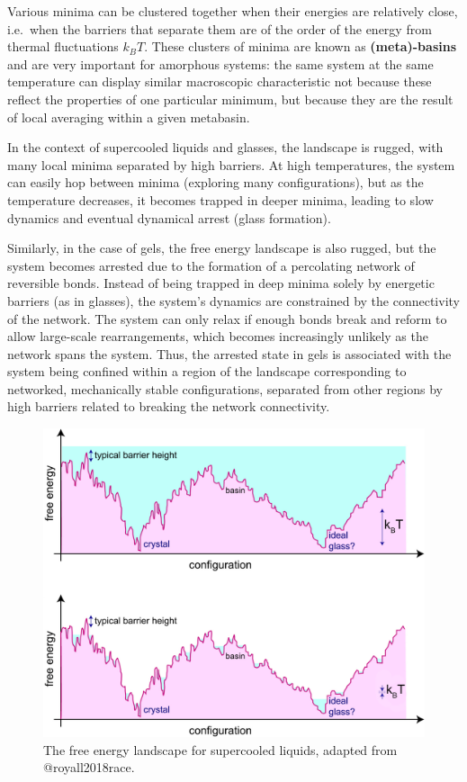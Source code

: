 \documentclass[
  letterpaper,
  enabledeprecatedfontcommands]{report}
\begin{document}
Various minima can be clustered together when their energies are
relatively close, i.e.~when the barriers that separate them are of the
order of the energy from thermal fluctuations \(k_B T\). These clusters
of minima are known as \textbf{(meta)-basins} and are very important for
amorphous systems: the same system at the same temperature can display
similar macroscopic characteristic not because these reflect the
properties of one particular minimum, but because they are the result of
local averaging within a given metabasin.

In the context of supercooled liquids and glasses, the landscape is
rugged, with many local minima separated by high barriers. At high
temperatures, the system can easily hop between minima (exploring many
configurations), but as the temperature decreases, it becomes trapped in
deeper minima, leading to slow dynamics and eventual dynamical arrest
(glass formation).

Similarly, in the case of gels, the free energy landscape is also
rugged, but the system becomes arrested due to the formation of a
percolating network of reversible bonds. Instead of being trapped in
deep minima solely by energetic barriers (as in glasses), the system's
dynamics are constrained by the connectivity of the network. The system
can only relax if enough bonds break and reform to allow large-scale
rearrangements, which becomes increasingly unlikely as the network spans
the system. Thus, the arrested state in gels is associated with the
system being confined within a region of the landscape corresponding to
networked, mechanically stable configurations, separated from other
regions by high barriers related to breaking the network connectivity.

\begin{figure}[H]

{\centering \includegraphics[width=0.8\linewidth,height=\textheight,keepaspectratio]{soft-matter/./figs/landscape.png}

}

\caption{The free energy landscape for supercooled liquids, adapted from
@royall2018race.}

\end{figure}%
\end{document}

